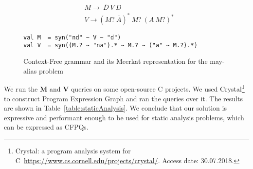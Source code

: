 \begin{figure}[h]
\begin{align*}
& M \rightarrow\ \overline{D}\ V\ D\\
& V \rightarrow (M ?\ \overline{A})^{*} \ M?\ (A\ M?)^{*}
\end{align*}

\begin{lstlisting}
val M  = syn("nd" ~ V ~ "d")
val V  = syn((M.? ~ "na").* ~ M.? ~ ("a" ~ M.?).*)
\end{lstlisting}
\caption{Context-Free grammar and its Meerkat representation for the may-alias problem}
\label{fig:aliasMeerkat}
\end{figure}

We run the \textbf{M} and \textbf{V} queries on some open-source C projects.
We used Crystal\footnote{Crystal: a program analysis system for C~\url{https://www.cs.cornell.edu/projects/crystal/}. Access date: 30.07.2018.} to construct Program Expression Graph and ran the queries over it.
The results are shown in Table~\ref{table:staticAnalysis}.
We conclude that our solution is expressive and performant enough to be used for static analysis problems, which can be expressed as CFPQs.



